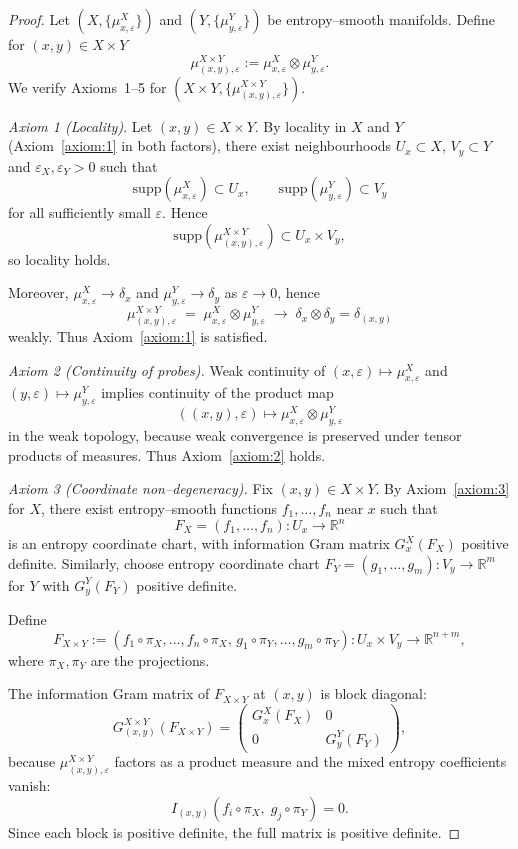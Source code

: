 \documentclass[11pt]{amsart}
\theoremstyle{definition}
\theoremstyle{remark}
\begin{document}
\begin{proof}
Let $(X,\{\mu^{X}_{x,\varepsilon}\})$ and $(Y,\{\mu^{Y}_{y,\varepsilon}\})$ be entropy–smooth manifolds.
Define for $(x,y)\in X\times Y$
\[
\mu^{X\times Y}_{(x,y),\varepsilon}
:= \mu^{X}_{x,\varepsilon}\otimes \mu^{Y}_{y,\varepsilon}.
\]
We verify Axioms~1–5 for $(X\times Y,\{\mu^{X\times Y}_{(x,y),\varepsilon}\})$.


\emph{Axiom 1 (Locality)}.
Let $(x,y)\in X\times Y$. By locality in $X$ and $Y$ (Axiom~\ref{axiom:1} in both factors),
there exist neighbourhoods $U_x\subset X$, $V_y\subset Y$ and $\varepsilon_X,\varepsilon_Y>0$
such that
\[
\mathrm{supp}(\mu^{X}_{x,\varepsilon})\subset U_x,\qquad
\mathrm{supp}(\mu^{Y}_{y,\varepsilon})\subset V_y
\]
for all sufficiently small $\varepsilon$. Hence
\[
\mathrm{supp}(\mu^{X\times Y}_{(x,y),\varepsilon})
\subset U_x\times V_y,
\]
so locality holds.

Moreover, $\mu^{X}_{x,\varepsilon}\to\delta_x$ and $\mu^{Y}_{y,\varepsilon}\to\delta_y$
as $\varepsilon\to0$, hence
\[
\mu^{X\times Y}_{(x,y),\varepsilon}
\;=\;\mu^{X}_{x,\varepsilon}\otimes\mu^{Y}_{y,\varepsilon}
\;\longrightarrow\;
\delta_x\otimes\delta_y=\delta_{(x,y)}
\]
weakly. Thus Axiom~\ref{axiom:1} is satisfied.

\medskip

\emph{Axiom 2 (Continuity of probes).}
Weak continuity of
$(x,\varepsilon)\mapsto\mu^{X}_{x,\varepsilon}$ and $(y,\varepsilon)\mapsto\mu^{Y}_{y,\varepsilon}$
implies continuity of the product map
\[
((x,y),\varepsilon) \longmapsto 
\mu^{X}_{x,\varepsilon}\otimes\mu^{Y}_{y,\varepsilon}
\]
in the weak topology, because weak convergence is preserved under tensor products of measures.
Thus Axiom~\ref{axiom:2} holds.

\medskip

\emph{Axiom 3 (Coordinate non–degeneracy).}
Fix $(x,y)\in X\times Y$. By Axiom~\ref{axiom:3} for $X$, there exist entropy–smooth functions
$f_1,\dots,f_n$ near $x$ such that
\[
F_X=(f_1,\dots,f_n):U_x\to\mathbb{R}^n
\]
is an entropy coordinate chart, with information Gram matrix
$G^X_{x}(F_X)$ positive definite.
Similarly, choose entropy coordinate chart
$F_Y=(g_1,\dots,g_m):V_y\to\mathbb{R}^m$ for $Y$ with
$G^{Y}_y(F_Y)$ positive definite.

Define
\[
F_{X\times Y} := (f_1\circ\pi_X,\dots,f_n\circ\pi_X,\,
                 g_1\circ\pi_Y,\dots,g_m\circ\pi_Y)
: U_x\times V_y \longrightarrow \mathbb{R}^{n+m},
\]
where $\pi_X,\pi_Y$ are the projections.

The information Gram matrix of $F_{X\times Y}$ at $(x,y)$ is block diagonal:
\[
G^{X\times Y}_{(x,y)}(F_{X\times Y})
=
\begin{pmatrix}
G^X_x(F_X) & 0 \\
0 & G^Y_y(F_Y)
\end{pmatrix},
\]
because $\mu^{X\times Y}_{(x,y),\varepsilon}$
factors as a product measure and the mixed entropy coefficients vanish:
\[
I_{(x,y)}(f_i\circ\pi_X,\; g_j\circ\pi_Y)=0.
\]
Since each block is positive definite, the full matrix is positive definite.


\end{proof}
\end{document}
